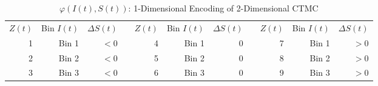 \begin{table}[H]
\centering
{}
\begin{tabular}{@{}rrrcrrrcrrr@{}}
\toprule
$Z(t)$ & Bin $I(t)$ & $\Delta S(t)$ & \phantom{abc} & $Z(t)$ & Bin $I(t)$ & $\Delta S(t)$ & \phantom{abc} & $Z(t)$ & Bin $I(t)$ & $\Delta S(t)$ \\
\cmidrule{1-3} \cmidrule{5-7} \cmidrule{9-11}
1 & Bin 1 & $<0$ && 4 & Bin 1 & $0$ && 7 & Bin 1 & $>0$ \\
2 & Bin 2 & $<0$ && 5 & Bin 2 & $0$ && 8 & Bin 2 & $>0$ \\
3 & Bin 3 & $<0$ && 6 & Bin 3 & $0$ && 9 & Bin 3 & $>0$ \\
\bottomrule
\end{tabular}
\caption{$\varphi(I(t),S(t))$: 1-Dimensional Encoding of 2-Dimensional CTMC}
\end{table}

